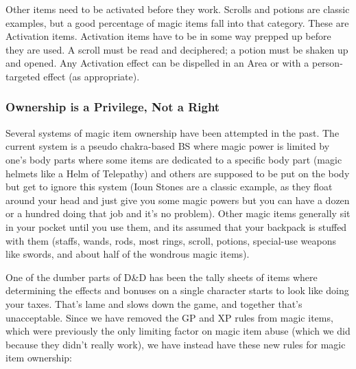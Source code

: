 Other items need to be activated before they work. Scrolls and potions are classic examples, but a good percentage of magic items fall into that category. These are Activation items. Activation items have to be in some way prepped up before they are used. A scroll must be read and deciphered; a potion must be shaken up and opened. Any Activation effect can be dispelled in an Area  or with a person-targeted effect (as appropriate).

\subsubsection{Ownership is a Privilege, Not a Right}

Several systems of magic item ownership have been attempted in the past. The current system is a pseudo chakra-based BS where magic power is limited by one's body parts where some items are dedicated to a specific body part (magic helmets like a Helm of Telepathy) and others are supposed to be put on the body but get to ignore this system (Ioun Stones are a classic example, as they float around your head and just give you some magic powers but you can have a dozen or a hundred doing that job and it's no problem). Other magic items generally sit in your pocket until you use them, and its assumed that your backpack is stuffed with them (staffs, wands, rods, most rings, scroll, potions, special-use weapons like  swords, and about half of the wondrous magic items).

One of the dumber parts of D\&D has been the tally sheets of items where determining the effects and bonuses on a single character starts to look like doing your taxes. That's lame and slows down the game, and together that's unacceptable. Since we have removed the GP and XP rules from magic items, which were previously the only limiting factor on magic item abuse (which we did because they didn't really work), we have instead have these new rules for magic item ownership:

